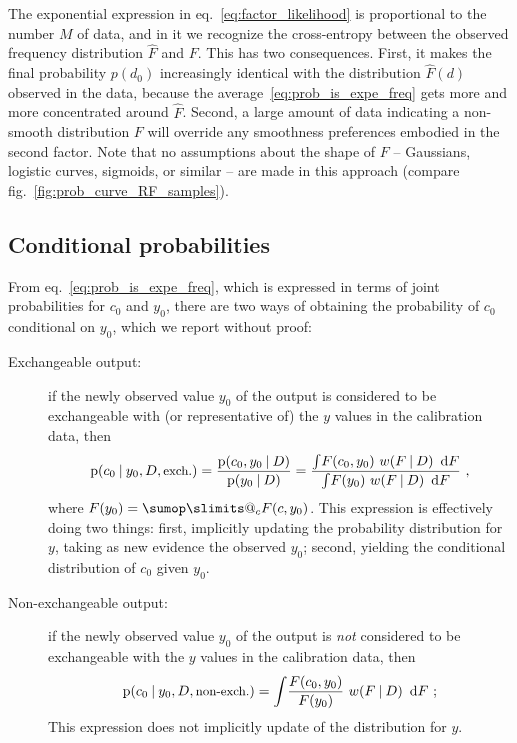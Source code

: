 \documentclass[a4paper,12pt,%
onecolumn,oneside,article,%
british%
]{memoir}
\makeatletter
\def\sum{\DOTSI\sumop\slimits@}
\newcommand*{\di}{\mathop{}\!\mathrm{d}}%
\newcommand*{\p}{\mathrm{p}}%
\renewcommand*{\|}[1][]{\nonscript\:#1\vert\nonscript\:\mathopen{}}
\newcommand*{\eqn}{eq.}%
\newcommand*{\fig}{fig.}%
\newcommand*{\wf}{w}
\newcommand*{\texts}[1]{\text{\small #1}}
\makeatother
\begin{document}
The exponential expression in \eqn~\eqref{eq:factor_likelihood} is proportional to the number $M$ of data, and in it we recognize the cross-entropy between the observed frequency distribution $\hat{F}$ and $F$. This has two consequences. First, it makes the final probability $p(d_{0})$ increasingly identical with the distribution $\hat{F}(d)$ observed in the data, because the average~\eqref{eq:prob_is_expe_freq} gets more and more concentrated around $\hat{F}$. Second, a large amount of data indicating a non-smooth distribution $F$ will override any smoothness preferences embodied in the second factor. Note that no assumptions about the shape of $F$ -- Gaussians, logistic curves, sigmoids, or similar -- are made in this approach (compare \fig~\ref{fig:prob_curve_RF_samples}).

\subsection{Conditional probabilities}
\label{sec:cond_probs}

From \eqn~\eqref{eq:prob_is_expe_freq}, which is expressed in terms of joint probabilities for $c_{0}$ and $y_{0}$, there are two ways of obtaining the probability of $c_{0}$ conditional on $y_{0}$, which we report without proof:
\begin{description}
\item[Exchangeable output:] if the newly observed value $y_{0}$ of the output is considered to be exchangeable with (or representative of) the $y$ values in the calibration data, then
  \begin{equation}
    \label{eq:c_cond_y_exchangeable}
    \p(c_{0} \| y_{0}, D, \texts{exch.}) =
    \frac{\p(c_{0}, y_{0} \| D)}{ \p(y_{0} \| D)} =
    \frac{\int\! F(c_{0}, y_{0})\ \wf(F \| D)\ \di F}{
      \int\! F(y_{0})\ \wf(F \| D)\ \di F} \ ,
  \end{equation}
  where $F(y_{0}) = \sum_{c}F(c, y_{0})$. This expression is effectively doing two things: first, implicitly updating the probability distribution for $y$, taking as new evidence the observed $y_{0}$; second, yielding the conditional distribution of $c_{0}$ given $y_{0}$.
    \item[Non-exchangeable output:] if the newly observed value $y_{0}$ of the output is \emph{not} considered to be exchangeable with the $y$ values in the calibration data, then
  \begin{equation}
    \label{eq:c_cond_y_exchangeable}
    \p(c_{0} \| y_{0}, D, \texts{non-exch.}) =
    \int\! \frac{F(c_{0}, y_{0})}{F(y_{0})}\ \wf(F \| D)\ \di F \ ;
  \end{equation}
  This expression does not implicitly update of the distribution for $y$.
\end{description}
\end{document}
